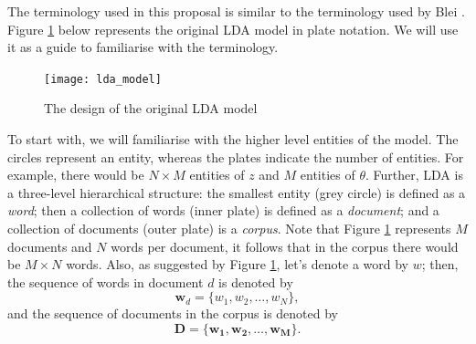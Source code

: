\documentclass{mprop}
\begin{document}
\par The terminology used in this proposal is similar to the terminology used by Blei \cite{blei_2012}. Figure \ref{fig:lda} below represents the original LDA model in plate notation. We will use it as a guide to familiarise with the terminology.   
\begin{figure}[H]
  \centering
  \texttt{[image: lda\_model]}
  \caption{The design of the original LDA model}
  \label{fig:lda}
\end{figure}

\par To start with, we will familiarise with the higher level entities of the model. The circles represent an entity, whereas the plates indicate the number of entities. For example, there would be $N \times M$ entities of $z$ and $M$ entities of $\theta$. Further, LDA is a three-level hierarchical structure: the smallest entity (grey circle) is defined as a \textit{word}; then a collection of words (inner plate) is defined as a \textit{document}; and a collection of documents (outer plate) is a \textit{corpus}. Note that Figure \ref{fig:lda} represents $M$ documents and $N$ words per document, it follows that in the corpus there would be $M \times N$ words. Also, as suggested by Figure \ref{fig:lda}, let's denote a word by $w$; then, the sequence of words in document $d$ is denoted by 
\begin{equation*}
\mathbf{w}_d = \{w_1, w_2, \dots, w_N\},
\end{equation*}
and the sequence of documents in the corpus is denoted by
\begin{equation*}
\mathcal{\mathbf{D}} = \{\mathbf{w_1}, \mathbf{w_2}, \dots, \mathbf{w_M}\}.
\end{equation*}
 
\end{document}
